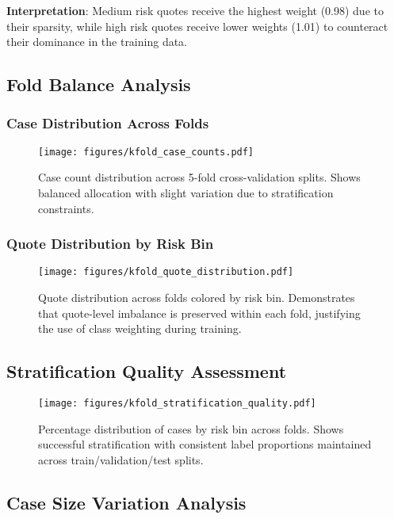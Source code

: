 \documentclass[11pt]{article}
\begin{document}
\textbf{Interpretation}: Medium risk quotes receive the highest weight (0.98) due to their sparsity, while high risk quotes receive lower weights (1.01) to counteract their dominance in the training data.

\subsection{Fold Balance Analysis}

\subsubsection{Case Distribution Across Folds}

\begin{figure}[H]
\centering
\texttt{[image: figures/kfold\_case\_counts.pdf]}
\caption{Case count distribution across 5-fold cross-validation splits. Shows balanced allocation with slight variation due to stratification constraints.}
\end{figure}

\subsubsection{Quote Distribution by Risk Bin}

\begin{figure}[H]
\centering
\texttt{[image: figures/kfold\_quote\_distribution.pdf]}
\caption{Quote distribution across folds colored by risk bin. Demonstrates that quote-level imbalance is preserved within each fold, justifying the use of class weighting during training.}
\end{figure}

\subsection{Stratification Quality Assessment}

\begin{figure}[H]
\centering
\texttt{[image: figures/kfold\_stratification\_quality.pdf]}
\caption{Percentage distribution of cases by risk bin across folds. Shows successful stratification with consistent label proportions maintained across train/validation/test splits.}
\end{figure}

\subsection{Case Size Variation Analysis}
\end{document}
